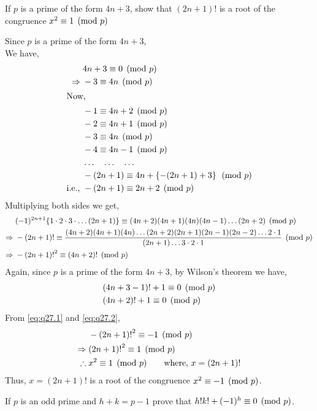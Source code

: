 \documentclass[12pt,class=book,crop=false]{standalone}
\begin{document}
\begin{qn}
    If $ p  $ is a prime of the form $ 4n+3 $, show that $ (2n+1)! $ is a root of the congruence $ x^2\equiv 1 \pmod{p} $
\end{qn}
\begin{soln}
    Since $ p $ is a prime of the form $ 4n+3 $,\\
    We have,
    \begin{align*}
        & 4n+3\equiv 0 \pmod{p}\\
        \Rightarrow\; & -3\equiv 4n \pmod{p}\\
        \intertext{Now,}
        & -1\equiv 4n+2 \pmod{p}\\
        & -2\equiv 4n+1 \pmod{p}\\
        & -3\equiv 4n \pmod{p}\\
        & -4\equiv 4n-1 \pmod{p}\\
        & \dots\quad \dots\quad \dots\\
        & -(2n+1)\equiv 4n+\left\{ -(2n+1)+3 \right\} \pmod{p}\\
        \text{i.e., }& -(2n+1)\equiv 2n+2 \pmod{p}
    \end{align*}
    Multiplying both sides we get,
    \begin{align}
        & (-1)^{2n+1} \{1\cdot2\cdot3\cdot \dots (2n+1)\}\equiv (4n+2)(4n+1)(4n)(4n-1)\dots (2n+2) \pmod{p}\notag \\
        \Rightarrow\; & -(2n+1)! \equiv \frac{(4n+2)(4n+1)(4n)\dots (2n+2)(2n+1)(2n-1)(2n-2)\dots2\cdot1}{(2n+1)\dots3\cdot2\cdot1} \pmod{p}\notag \\
        \Rightarrow\; & -{(2n+1)!}^2 \equiv (4n+2)! \pmod{p}\label{eq:q27.1}
    \end{align}
    Again, since $ p $ is a prime of the form $ 4n+3 $, by Wilson's theorem we have,
    \begin{align}
        &(4n+3-1)!+1\equiv 0 \pmod{p}\notag\\
        &(4n+2)!+1\equiv 0 \pmod{p}\label{eq:q27.2}
    \end{align}
    From \eqref{eq:q27.1} and \eqref{eq:q27.2},
    \begin{align*}
        &-{(2n+1)!}^2\equiv -1 \pmod{p}\\
        \Rightarrow\; &{(2n+1)!}^2\equiv 1 \pmod{p}\\
        \therefore\; &x^2\equiv 1 \pmod{p}\qquad \text{where, } x=(2n+1)!
    \end{align*}
    Thus, $ x=(2n+1)! $ is a root of the congruence $ x^2\equiv -1 \pmod{p} $.
\end{soln}
\begin{qn}
    If $ p $ is an odd prime and $ h+k=p-1 $ prove that $ h! k! + (-1)^h\equiv 0 \pmod{p} $.
\end{qn}
\end{document}
